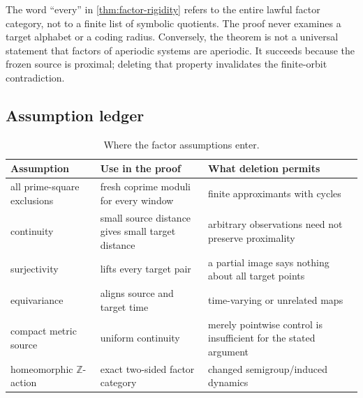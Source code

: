 The word ``every'' in \cref{thm:factor-rigidity} refers to the entire lawful
factor category, not to a finite list of symbolic quotients.  The proof never
examines a target alphabet or a coding radius.  Conversely, the theorem is
not a universal statement that factors of aperiodic systems are aperiodic.
It succeeds because the frozen source is proximal; deleting that property
invalidates the finite-orbit contradiction.

\subsection{Assumption ledger}

\begin{table}[t]
\centering
\small
\caption{Where the factor assumptions enter.}
\label{tab:factor-assumptions}
\begin{tabularx}{\textwidth}{@{}l>{\raggedright\arraybackslash}X
  >{\raggedright\arraybackslash}X@{}}
\toprule
Assumption & Use in the proof & What deletion permits \\
\midrule
all prime-square exclusions & fresh coprime moduli for every window & finite
  approximants with cycles \\
continuity & small source distance gives small target distance & arbitrary
  observations need not preserve proximality \\
surjectivity & lifts every target pair & a partial image says nothing about
  all target points \\
equivariance & aligns source and target time & time-varying or unrelated maps \\
compact metric source & uniform continuity & merely pointwise control is
  insufficient for the stated argument \\
homeomorphic \(\mathbb Z\)-action & exact two-sided factor category & changed
  semigroup/induced dynamics \\
\bottomrule
\end{tabularx}
\end{table}

